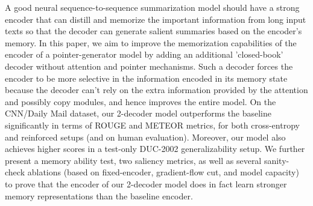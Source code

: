 A good neural sequence-to-sequence summarization model should have a strong encoder that can distill and memorize the important information from long input texts so that the decoder can generate salient summaries based on the encoder's memory. In this paper, we aim to improve the memorization capabilities of the encoder of a pointer-generator model by adding an additional 'closed-book' decoder without attention and pointer mechanisms. Such a decoder forces the encoder to be more selective in the information encoded in its memory state because the decoder can't rely on the extra information provided by the attention and possibly copy modules, and hence improves the entire model. On the CNN/Daily Mail dataset, our 2-decoder model outperforms the baseline significantly in terms of ROUGE and METEOR metrics, for both cross-entropy and reinforced setups (and on human evaluation). Moreover, our model also achieves higher scores in a test-only DUC-2002 generalizability setup. We further present a memory ability test, two saliency metrics, as well as several sanity-check ablations (based on fixed-encoder, gradient-flow cut, and model capacity) to prove that the encoder of our 2-decoder model does in fact learn stronger memory representations than the baseline encoder.
